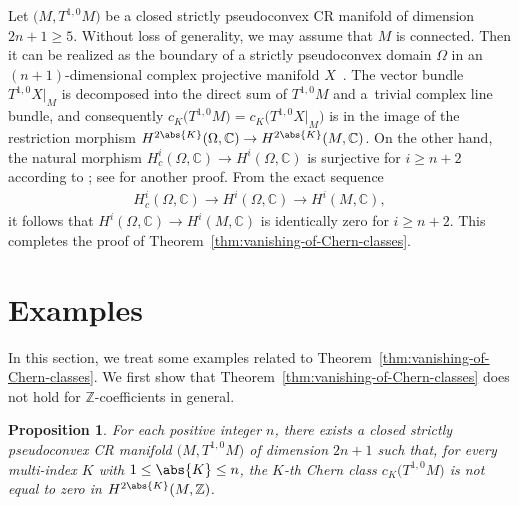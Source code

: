\documentclass[pdftex]{sigma}
\numberwithin{equation}{section}
\newtheorem{Proposition}[Theorem]{Proposition}
 { \theoremstyle{definition}
\newtheorem{Remark}[Theorem]{Remark} }
\begin{document}
Let $\big(M,T^{1,0} M\big)$ be a closed strictly pseudoconvex CR manifold of dimension $2 n + 1 \geq 5$. Without loss of generality, we may assume that $M$ is connected.
Then it can be realized as the boundary of a strictly pseudoconvex domain $\Omega$ in an $(n + 1)$-dimensional complex projective manifold $X$~\cite[Theorem~8.1]{Lempert95}.
The vector bundle $T^{1, 0} X |_{M}$ is decomposed into the direct sum of $T^{1, 0} M$ and a~trivial complex line bundle, and consequently $c_{K}\big(T^{1,0}M\big) = c_{K}\big(T^{1, 0} X |_{M}\big)$ is in the image of the restriction morphism $H^{2 \abs{K}}(\Omega, \mathbb{C}) \to H^{2 \abs{K}}(M, \mathbb{C})$. On the other hand, the natural morphism $H^{i}_{c}(\Omega, \mathbb{C}) \to H^{i}(\Omega, \mathbb{C})$ is surjective for $i \geq n + 2$ according to \cite[Corollary~4]{Ohsawa82}; see \cite[Lemma]{Bungart92} for another proof. From the exact sequence
\begin{gather*}
H^{i}_{c}(\Omega, \mathbb{C}) \to H^{i}(\Omega, \mathbb{C}) \to H^{i}(M, \mathbb{C}),
\end{gather*}
it follows that $H^{i}(\Omega, \mathbb{C}) \to H^{i}(M, \mathbb{C})$ is identically zero for $i \geq n + 2$. This completes the proof of Theorem~\ref{thm:vanishing-of-Chern-classes}.

\section{Examples} \label{section:examples}

In this section, we treat some examples related to Theorem~\ref{thm:vanishing-of-Chern-classes}. We first show that Theorem~\ref{thm:vanishing-of-Chern-classes} does not hold for $\mathbb{Z}$-coefficients in general.

\begin{Proposition} \label{prop:non-vanishing-torsion} For each positive integer $n$, there exists a closed strictly pseudoconvex CR manifold $\big(M,T^{1,0} M\big)$ of dimension $2 n + 1$ such that, for every multi-index $K$ with $1 \leq \abs{K} \leq n$, the $K$-th Chern class $c_{K}\big(T^{1,0}M\big)$ is not equal to zero in $H^{2 \abs{K}}(M, \mathbb{Z})$.
\end{Proposition}
\end{document}
